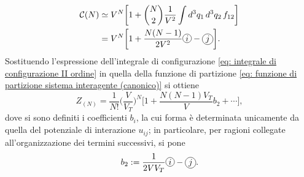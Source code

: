 \begin{equation}
\label{eq: integrale di configurazione II ordine}
    \begin{split}
        \intconfig &\simeq V^N\bigg[1 + \binom{N}{2}\frac{1}{V^2}\int d^3q_1\,d^3q_2\,f_{12} \bigg] \\
        &= V^N\bigg[1 + \frac{N(N-1)}{2V^2}\circled{i}-\circled{j}\bigg].
    \end{split}
\end{equation}
Sostituendo l'espressione dell'integrale di configurazione \eqref{eq: integrale di configurazione II ordine} in quella della funzione di partizione \eqref{eq: funzione di partizione sistema interagente (canonico)} si ottiene
\begin{equation}
    Z_{(N)} = \frac{1}{N!}\bigg(\frac{V}{V_T}\bigg)^N\bigg[1 + \frac{N(N-1)V_T}{V}b_2 + \cdots\bigg],
\end{equation}
dove si sono definiti i coefficienti $b_i$, la cui forma è determinata unicamente da quella del potenziale di interazione $u_{ij}$; in particolare, per ragioni collegate all'organizzazione dei termini successivi, si pone
\begin{equation}
    b_2 := \frac{1}{2VV_T}\circled{i}-\circled{j}.
\end{equation}

